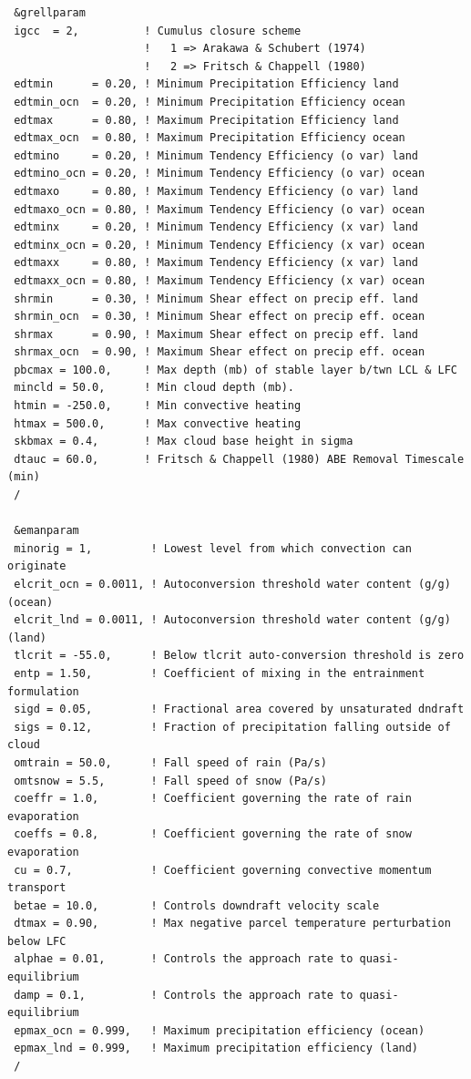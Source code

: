 {\footnotesize
\begin{Verbatim}
 &grellparam
 igcc  = 2,          ! Cumulus closure scheme
                     !   1 => Arakawa & Schubert (1974)
                     !   2 => Fritsch & Chappell (1980)
 edtmin      = 0.20, ! Minimum Precipitation Efficiency land
 edtmin_ocn  = 0.20, ! Minimum Precipitation Efficiency ocean
 edtmax      = 0.80, ! Maximum Precipitation Efficiency land
 edtmax_ocn  = 0.80, ! Maximum Precipitation Efficiency ocean
 edtmino     = 0.20, ! Minimum Tendency Efficiency (o var) land
 edtmino_ocn = 0.20, ! Minimum Tendency Efficiency (o var) ocean
 edtmaxo     = 0.80, ! Maximum Tendency Efficiency (o var) land
 edtmaxo_ocn = 0.80, ! Maximum Tendency Efficiency (o var) ocean
 edtminx     = 0.20, ! Minimum Tendency Efficiency (x var) land
 edtminx_ocn = 0.20, ! Minimum Tendency Efficiency (x var) ocean
 edtmaxx     = 0.80, ! Maximum Tendency Efficiency (x var) land
 edtmaxx_ocn = 0.80, ! Maximum Tendency Efficiency (x var) ocean
 shrmin      = 0.30, ! Minimum Shear effect on precip eff. land
 shrmin_ocn  = 0.30, ! Minimum Shear effect on precip eff. ocean
 shrmax      = 0.90, ! Maximum Shear effect on precip eff. land
 shrmax_ocn  = 0.90, ! Maximum Shear effect on precip eff. ocean
 pbcmax = 100.0,     ! Max depth (mb) of stable layer b/twn LCL & LFC
 mincld = 50.0,      ! Min cloud depth (mb).
 htmin = -250.0,     ! Min convective heating
 htmax = 500.0,      ! Max convective heating
 skbmax = 0.4,       ! Max cloud base height in sigma
 dtauc = 60.0,       ! Fritsch & Chappell (1980) ABE Removal Timescale (min)
 /

 &emanparam
 minorig = 1,         ! Lowest level from which convection can originate
 elcrit_ocn = 0.0011, ! Autoconversion threshold water content (g/g) (ocean)
 elcrit_lnd = 0.0011, ! Autoconversion threshold water content (g/g) (land)
 tlcrit = -55.0,      ! Below tlcrit auto-conversion threshold is zero
 entp = 1.50,         ! Coefficient of mixing in the entrainment formulation
 sigd = 0.05,         ! Fractional area covered by unsaturated dndraft
 sigs = 0.12,         ! Fraction of precipitation falling outside of cloud
 omtrain = 50.0,      ! Fall speed of rain (Pa/s)
 omtsnow = 5.5,       ! Fall speed of snow (Pa/s)
 coeffr = 1.0,        ! Coefficient governing the rate of rain evaporation
 coeffs = 0.8,        ! Coefficient governing the rate of snow evaporation
 cu = 0.7,            ! Coefficient governing convective momentum transport
 betae = 10.0,        ! Controls downdraft velocity scale
 dtmax = 0.90,        ! Max negative parcel temperature perturbation below LFC
 alphae = 0.01,       ! Controls the approach rate to quasi-equilibrium
 damp = 0.1,          ! Controls the approach rate to quasi-equilibrium
 epmax_ocn = 0.999,   ! Maximum precipitation efficiency (ocean)
 epmax_lnd = 0.999,   ! Maximum precipitation efficiency (land)
 /


\end{Verbatim}}
